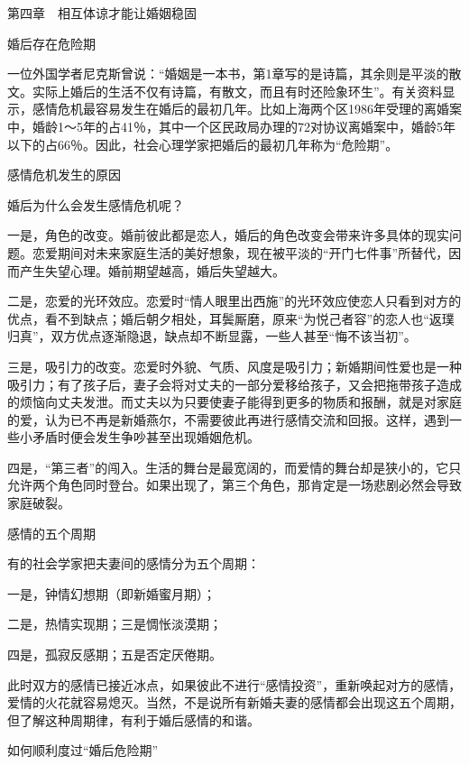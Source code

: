 \documentclass[12pt,UTF8]{ctexbook}
\begin{document}
第四章　相互体谅才能让婚姻稳固


婚后存在危险期


一位外国学者尼克斯曾说：“婚姻是一本书，第1章写的是诗篇，其余则是平淡的散文。实际上婚后的生活不仅有诗篇，有散文，而且有时还险象环生”。有关资料显示，感情危机最容易发生在婚后的最初几年。比如上海两个区1986年受理的离婚案中，婚龄1～5年的占41％，其中一个区民政局办理的72对协议离婚案中，婚龄5年以下的占66％。因此，社会心理学家把婚后的最初几年称为“危险期”。





感情危机发生的原因


婚后为什么会发生感情危机呢？

一是，角色的改变。婚前彼此都是恋人，婚后的角色改变会带来许多具体的现实问题。恋爱期间对未来家庭生活的美好想象，现在被平淡的“开门七件事”所替代，因而产生失望心理。婚前期望越高，婚后失望越大。

二是，恋爱的光环效应。恋爱时“情人眼里出西施”的光环效应使恋人只看到对方的优点，看不到缺点；婚后朝夕相处，耳鬓厮磨，原来“为悦己者容”的恋人也“返璞归真”，双方优点逐渐隐退，缺点却不断显露，一些人甚至“悔不该当初”。

三是，吸引力的改变。恋爱时外貌、气质、风度是吸引力；新婚期间性爱也是一种吸引力；有了孩子后，妻子会将对丈夫的一部分爱移给孩子，又会把拖带孩子造成的烦恼向丈夫发泄。而丈夫以为只要使妻子能得到更多的物质和报酬，就是对家庭的爱，认为已不再是新婚燕尔，不需要彼此再进行感情交流和回报。这样，遇到一些小矛盾时便会发生争吵甚至出现婚姻危机。

四是，“第三者”的闯入。生活的舞台是最宽阔的，而爱情的舞台却是狭小的，它只允许两个角色同时登台。如果出现了，第三个角色，那肯定是一场悲剧必然会导致家庭破裂。





感情的五个周期


有的社会学家把夫妻间的感情分为五个周期：

一是，钟情幻想期（即新婚蜜月期）；

二是，热情实现期；三是惆怅淡漠期；

四是，孤寂反感期；五是否定厌倦期。

此时双方的感情已接近冰点，如果彼此不进行“感情投资”，重新唤起对方的感情，爱情的火花就容易熄灭。当然，不是说所有新婚夫妻的感情都会出现这五个周期，但了解这种周期律，有利于婚后感情的和谐。





如何顺利度过“婚后危险期”
\end{document}
